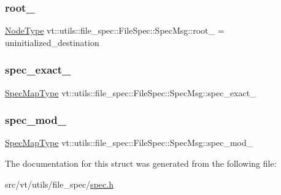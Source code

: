 \subsubsection{\texorpdfstring{root\+\_\+}{root\_}}
{\footnotesize\ttfamily \hyperlink{namespacevt_a866da9d0efc19c0a1ce79e9e492f47e2}{Node\+Type} vt\+::utils\+::file\+\_\+spec\+::\+File\+Spec\+::\+Spec\+Msg\+::root\+\_\+ = uninitialized\+\_\+destination}

\mbox{\label{structvt_1_1utils_1_1file__spec_1_1_file_spec_1_1_spec_msg_a1be8df83618a2e2b7cdf857ae292c0fd}} 
\subsubsection{\texorpdfstring{spec\+\_\+exact\+\_\+}{spec\_exact\_}}
{\footnotesize\ttfamily \hyperlink{structvt_1_1utils_1_1file__spec_1_1_file_spec_a368a4ab8bf689e0b533abac71ae9393b}{Spec\+Map\+Type} vt\+::utils\+::file\+\_\+spec\+::\+File\+Spec\+::\+Spec\+Msg\+::spec\+\_\+exact\+\_\+}

\mbox{\label{structvt_1_1utils_1_1file__spec_1_1_file_spec_1_1_spec_msg_ac68c7bf1a220b58f863eb4b2d8c9dd21}} 
\subsubsection{\texorpdfstring{spec\+\_\+mod\+\_\+}{spec\_mod\_}}
{\footnotesize\ttfamily \hyperlink{structvt_1_1utils_1_1file__spec_1_1_file_spec_a368a4ab8bf689e0b533abac71ae9393b}{Spec\+Map\+Type} vt\+::utils\+::file\+\_\+spec\+::\+File\+Spec\+::\+Spec\+Msg\+::spec\+\_\+mod\+\_\+}



The documentation for this struct was generated from the following file\+:\begin{DoxyCompactItemize}
\item 
src/vt/utils/file\+\_\+spec/\hyperlink{spec_8h}{spec.\+h}\end{DoxyCompactItemize}
